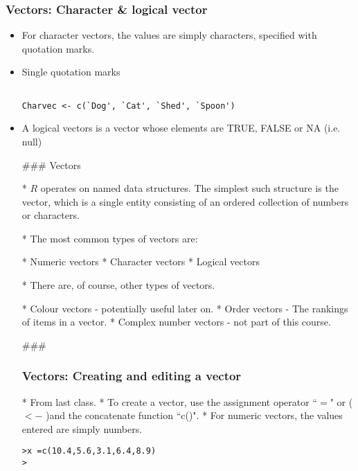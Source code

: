 \begin{frame}[fragile]
\frametitle{Vectors: Character \& logical vector}

\begin{itemize}
\item For character vectors, the values are simply characters,
specified with quotation marks.
\item Single quotation marks
\begin{framed}
\begin{verbatim}

Charvec <- c(`Dog', `Cat', `Shed', `Spoon')

\end{verbatim}
\end{framed}

\item A logical vectors is a vector whose elements are TRUE, FALSE
or NA (i.e. null)

### {Vectors}

*  $R$ operates on named data structures. The simplest such
structure is the vector, which is a single entity consisting of an
ordered collection of numbers or characters.

*  The most common types of vectors are:

*  Numeric vectors *  Character vectors *  Logical
vectors


*  There are, of course, other types of vectors.

*  Colour vectors - potentially useful later on.
*  Order vectors - The rankings of items in a vector.
*  Complex number vectors - not part of this course.



### 
\frametitle{Vectors: Creating and editing a vector}

*  From last class.
*  To create a vector, use the assignment operator ``$=$" or ( $<-$ )and
the concatenate function ``c()". *  For numeric vectors, the values
entered are simply numbers.
\begin{framed}
\begin{verbatim}
>x =c(10.4,5.6,3.1,6.4,8.9)
>
\end{verbatim}
\end{framed}






\end{itemize}
\end{frame}
